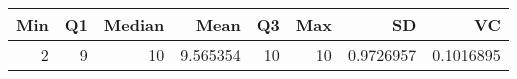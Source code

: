 
\begin{tabular}[t]{rrrrrrrr}
\toprule
Min & Q1 & Median & Mean & Q3 & Max & SD & VC\\
\midrule
2 & 9 & 10 & 9.565354 & 10 & 10 & 0.9726957 & 0.1016895\\
\bottomrule
\end{tabular}